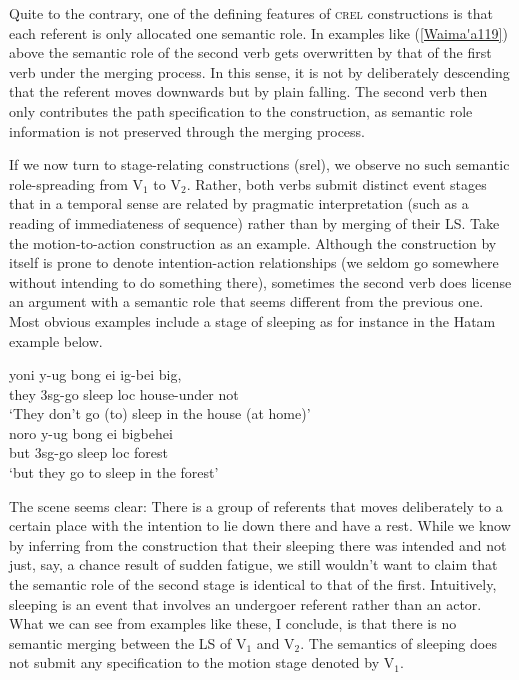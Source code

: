 Quite to the contrary, one of the defining features of \textsc{crel} constructions is that each referent is only allocated one semantic role. In examples like (\ref{Waima'a119}) above the semantic role of the second verb gets overwritten by that of the first verb under the merging process. In this sense, it is not by deliberately descending that the referent moves downwards but by plain falling. The second verb then only contributes the path specification to the construction, as semantic role information is not preserved through the merging process.
 
If we now turn to stage-relating constructions (\acs{srel}), we observe no such semantic role-spreading from V$_1$ to V$_2$. Rather, both verbs submit distinct event stages that in a temporal sense are related by pragmatic interpretation (such as a reading of immediateness of sequence) rather than by merging of their LS. Take the motion-to-action construction as an example. Although the construction by itself is prone to denote intention-action relationships (we seldom go somewhere without intending to do something there), sometimes the second verb does license an argument with a semantic role that seems different from the previous one. Most obvious examples include a stage of sleeping as for instance in the Hatam example below.

\pex \label{Hatam6465}
\a
\gll yoni y-ug bong ei ig-bei big, \\
they \acs{3}\acs{sg}-go sleep \acs{loc} house-under not \\
\glft `They don't go (to) sleep in the house (at home)' \\ 
\z
\a
\gll noro y-ug bong ei bigbehei \\ 
but \acs{3}\acs{sg}-go sleep \acs{loc} forest \\
\glft `but they go to sleep in the forest' \\ 
\z
\xe

The scene seems clear: There is a group of referents that moves deliberately to a certain place with the intention to lie down there and have a rest. While we know by inferring from the construction that their sleeping there was intended and not just, say, a chance result of sudden fatigue, we still wouldn't want to claim that the semantic role of the second stage is identical to that of the first. Intuitively, sleeping is an event that involves an undergoer referent rather than an actor. What we can see from examples like these, I conclude, is that there is no semantic merging between the LS of V$_1$ and V$_2$. The semantics of sleeping does not submit any specification to the motion stage denoted by V$_1$.

